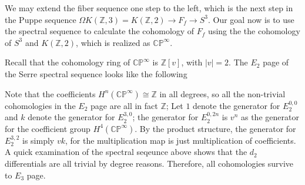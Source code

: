 \documentclass{article}
\theoremstyle{definition}
\theoremstyle{definition}
\theoremstyle{definition}
\theoremstyle{definition}
\theoremstyle{definition}
\theoremstyle{definition}
\theoremstyle{definition}
\begin{document}
We may extend the fiber sequence one step to the left, which is the next step in the Puppe sequence $\Omega K(\mathbb{Z},3)=K(\mathbb{Z},2)\to F_f\to S^3$. Our goal now is to use the spectral sequence to calculate the cohomology of $F_f$ using the the cohomology of $S^3$ and $K(\mathbb{Z},2)$, which is realized as $\mathbb{CP}^{\infty}$. 

Recall that the cohomology ring of $\mathbb{CP}^{\infty}$ is $\mathbb{Z}[v]$, with $|v|=2$. The $E_2$ page of the Serre spectral sequence looks like the following 


Note that the coefficients $H^n(\mathbb{CP}^{\infty})\cong \mathbb{Z}$ in all degrees, so all the non-trivial cohomologies in the $E_2$ page are all in fact $\mathbb{Z}$; Let $1$ denote the generator for $E_2^{0,0}$ and $k$ denote the generator for $E_2^{3,0}$; the generator for $E_2^{0,2n}$ is $v^n$ as the generator for the coefficient group $H^4(\mathbb{CP}^{\infty})$. By the product structure, the generator for $E_2^{3,2}$ is simply $vk$, for the multiplication map is just multiplication of coefficients.
A quick examination of the spectral seqeunce above shows that the $d_2$ differentials are all trivial by degree reasons. Therefore, all cohomologies survive to $E_3$ page.
\end{document}
